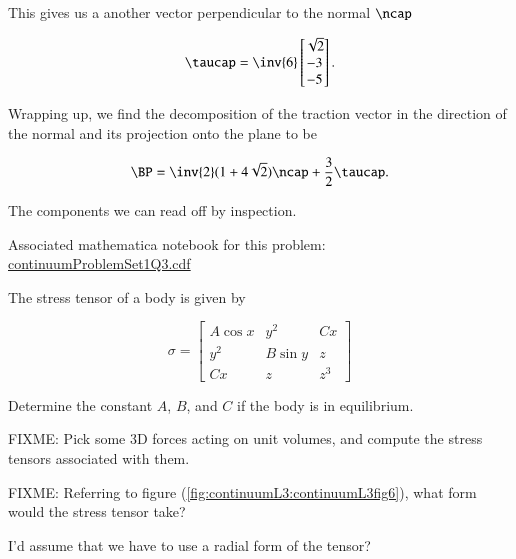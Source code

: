 \begin{Answer}[ref={problem:continuumProblemSet1:q3}]
This gives us a another vector perpendicular to the normal $\ncap$

\begin{equation}\label{eqn:continuumProblemSet1:490}
\taucap = 
\inv{6}
\begin{bmatrix}
\sqrt{2} \\
-3 \\
-5
\end{bmatrix}.
\end{equation}

Wrapping up, we find the decomposition of the traction vector in the direction of the normal and its projection onto the plane to be

\begin{equation}\label{eqn:continuumProblemSet1:510}
\BP 
= 
\inv{2}(1 + 4\sqrt{2}) \ncap
+
\frac{3}{2} \taucap.
\end{equation}

The components we can read off by inspection.

Associated mathematica notebook for this problem:
\href{https://raw.github.com/peeterjoot/physicsplay/master/notes/phy454/mathematica/continuumProblemSet1Q3.cdf}{continuumProblemSet1Q3.cdf}
\end{Answer}

\begin{Exercise}[title={Stress and equilibrium}, label={problem:continuumProblemSet1:q4}]
The stress tensor of a body is given by

\begin{equation}\label{eqn:continuumProblemSet1:90}
\sigma =
\begin{bmatrix}
A \cos x & y^2 & C x \\
y^2 & B \sin y & z \\
C x & z & z^3
\end{bmatrix}
\end{equation}

Determine the constant $A$, $B$, and $C$ if the body is in equilibrium.
\end{Exercise}

\begin{Exercise}[title={Compute stress tensors for some typical 3D forces}, label={problem:stressFIXME:p1}]

FIXME: Pick some 3D forces acting on unit volumes, and compute the stress tensors associated with them.

\end{Exercise}

\begin{Exercise}[title={Compute stress tensors for some typical 3D forces}, label={problem:stressFIXME:p2}]

FIXME: Referring to figure (\ref{fig:continuumL3:continuumL3fig6}), what form would the stress tensor take?

I'd assume that we have to use a radial form of the tensor?
\end{Exercise}

